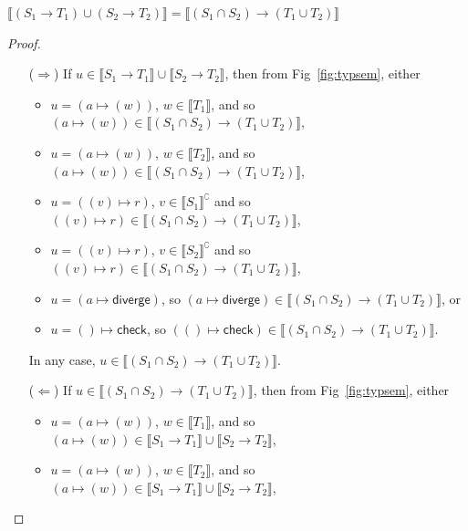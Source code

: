 \documentclass[acmsmall,review,screen]{acmart}
\newcommand{\DIVERGE}{\mathsf{diverge}}
\newcommand{\CHECK}{\mathsf{check}}
\newcommand{\fun}{\mathbin{\rightarrow}}
\newcommand{\sem}[1]{\llbracket{#1}\rrbracket}
\newcommand{\nsem}[1]{\llbracket{#1}\rrbracket^\complement}
\begin{document}
\begin{lemma}
  $\sem{(S_1 \fun T_1) \cup (S_2 \fun T_2)} =
   \sem{(S_1 \cap S_2) \fun (T_1 \cup T_2)}$
\end{lemma}
\begin{proof} \mbox{}
  \begin{enumerate}
    
  \item[($\Rightarrow$)]
  If $u \in \sem{S_1 \fun T_1} \cup \sem{S_2 \fun T_2}$,
  then from Fig~\ref{fig:typsem}, either
  \begin{itemize}
    
  \item $u = (a \mapsto (w))$, $w \in \sem{T_1}$, 
    and so $(a \mapsto (w)) \in \sem{(S_1 \cap S_2) \fun (T_1 \cup T_2)}$,

  \item $u = (a \mapsto (w))$, $w \in \sem{T_2}$, 
    and so $(a \mapsto (w)) \in \sem{(S_1 \cap S_2) \fun (T_1 \cup T_2)}$,

  \item $u = ((v) \mapsto r)$, $v \in \nsem{S_1}$
    and so $((v) \mapsto r) \in \sem{(S_1 \cap S_2) \fun (T_1 \cup T_2)}$,

  \item $u = ((v) \mapsto r)$, $v \in \nsem{S_2}$
    and so $((v) \mapsto r) \in \sem{(S_1 \cap S_2) \fun (T_1 \cup T_2)}$,

  \item $u = (a \mapsto \DIVERGE)$, so $(a \mapsto \DIVERGE) \in \sem{(S_1 \cap S_2) \fun (T_1 \cup T_2)}$, or
    
  \item $u = () \mapsto \CHECK$, so $(() \mapsto \CHECK) \in \sem{(S_1 \cap S_2) \fun (T_1 \cup T_2)}$.

  \end{itemize}
  In any case, $u \in \sem{(S_1 \cap S_2) \fun (T_1 \cup T_2)}$.

  \item[($\Leftarrow$)]
  If $u \in \sem{(S_1 \cap S_2) \fun (T_1 \cup T_2)}$,
  then from Fig~\ref{fig:typsem}, either
  \begin{itemize}
    
  \item $u = (a \mapsto (w))$, $w \in \sem{T_1}$, 
    and so $(a \mapsto (w)) \in \sem{S_1 \fun T_1} \cup \sem{S_2 \fun T_2}$,

  \item $u = (a \mapsto (w))$, $w \in \sem{T_2}$, 
    and so $(a \mapsto (w)) \in \sem{S_1 \fun T_1} \cup \sem{S_2 \fun T_2}$,


\end{itemize}
\end{enumerate}
\end{proof}
\end{document}
